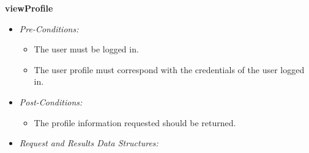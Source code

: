 \documentclass[a4paper,12pt]{article}
\begin{document}
\textbf{\large{viewProfile}}
	\begin{itemize}
		\item \textit{Pre-Conditions:}
			\begin{itemize}
				\item The user must be logged in.
				\item The user profile must correspond with the credentials of the user logged in.
			\end{itemize}
		\item \textit{Post-Conditions:}
			\begin{itemize}
				\item The profile information requested should be returned.
			\end{itemize}
		\item \textit{Request and Results Data Structures:}
	\end{itemize}
\end{document}

